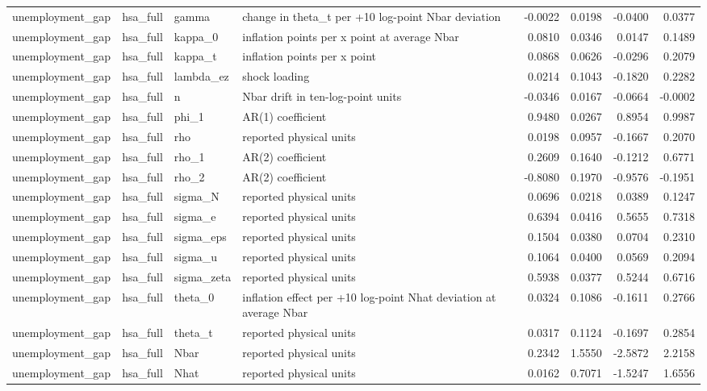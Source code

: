 \begin{tabular}{llllrrrr}
unemployment\_gap & hsa\_full & gamma & change in theta\_t per +10 log-point Nbar deviation & -0.0022 & 0.0198 & -0.0400 & 0.0377 \\
unemployment\_gap & hsa\_full & kappa\_0 & inflation points per x point at average Nbar & 0.0810 & 0.0346 & 0.0147 & 0.1489 \\
unemployment\_gap & hsa\_full & kappa\_t & inflation points per x point & 0.0868 & 0.0626 & -0.0296 & 0.2079 \\
unemployment\_gap & hsa\_full & lambda\_ez & shock loading & 0.0214 & 0.1043 & -0.1820 & 0.2282 \\
unemployment\_gap & hsa\_full & n & Nbar drift in ten-log-point units & -0.0346 & 0.0167 & -0.0664 & -0.0002 \\
unemployment\_gap & hsa\_full & phi\_1 & AR(1) coefficient & 0.9480 & 0.0267 & 0.8954 & 0.9987 \\
unemployment\_gap & hsa\_full & rho & reported physical units & 0.0198 & 0.0957 & -0.1667 & 0.2070 \\
unemployment\_gap & hsa\_full & rho\_1 & AR(2) coefficient & 0.2609 & 0.1640 & -0.1212 & 0.6771 \\
unemployment\_gap & hsa\_full & rho\_2 & AR(2) coefficient & -0.8080 & 0.1970 & -0.9576 & -0.1951 \\
unemployment\_gap & hsa\_full & sigma\_N & reported physical units & 0.0696 & 0.0218 & 0.0389 & 0.1247 \\
unemployment\_gap & hsa\_full & sigma\_e & reported physical units & 0.6394 & 0.0416 & 0.5655 & 0.7318 \\
unemployment\_gap & hsa\_full & sigma\_eps & reported physical units & 0.1504 & 0.0380 & 0.0704 & 0.2310 \\
unemployment\_gap & hsa\_full & sigma\_u & reported physical units & 0.1064 & 0.0400 & 0.0569 & 0.2094 \\
unemployment\_gap & hsa\_full & sigma\_zeta & reported physical units & 0.5938 & 0.0377 & 0.5244 & 0.6716 \\
unemployment\_gap & hsa\_full & theta\_0 & inflation effect per +10 log-point Nhat deviation at average Nbar & 0.0324 & 0.1086 & -0.1611 & 0.2766 \\
unemployment\_gap & hsa\_full & theta\_t & reported physical units & 0.0317 & 0.1124 & -0.1697 & 0.2854 \\
unemployment\_gap & hsa\_full & Nbar & reported physical units & 0.2342 & 1.5550 & -2.5872 & 2.2158 \\
unemployment\_gap & hsa\_full & Nhat & reported physical units & 0.0162 & 0.7071 & -1.5247 & 1.6556 \\

\end{tabular}

